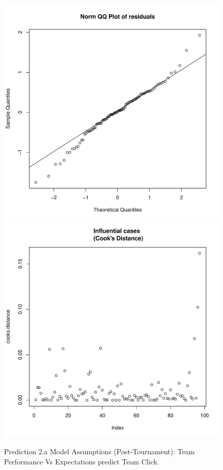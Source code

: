 \begin{CJK}{UTF8}{gbsn}
\begin{figure}[!htbp]
         \includegraphics[scale =.4]{images/MLM1bQQNorm.pdf}
         \includegraphics[scale =.4]{images/MLM1bCooksD.pdf}
         \caption{Prediction 2.a Model Assumptions (Post-Tournament): Team Performance Vs Expectations predict Team Click.}
         \label{fig:MLM1bAssumptions}
       \end{figure}




\end{CJK}
